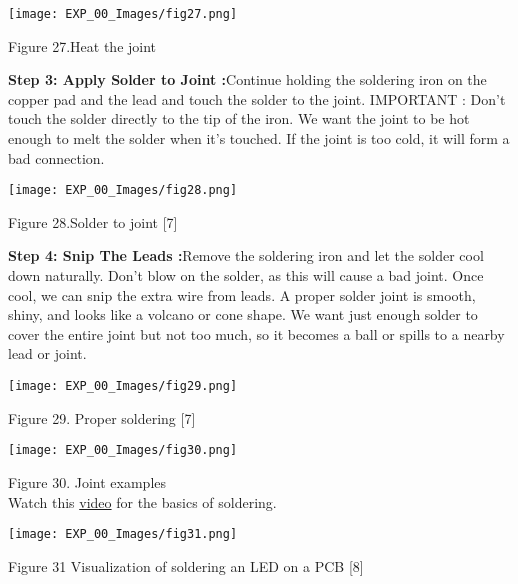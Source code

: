 \documentclass[12pt,a4paper]{article}
\begin{document}
\begin{justify}
\begin{center} 
\texttt{[image: EXP\_00\_Images/fig27.png]}
\end{center}
\vspace{-8mm}
\begin{center} {Figure 27.Heat the joint}\end{center}


\noindent \textbf{Step 3: Apply Solder to Joint :}Continue holding the soldering iron on the copper pad and the lead and touch the solder to the joint. IMPORTANT : Don't touch the solder directly to the tip of the iron. We want the joint to be hot enough to melt the solder when it's touched. If the joint is too cold, it will form a bad connection.

\begin{center} 
\texttt{[image: EXP\_00\_Images/fig28.png]}
\end{center}
\vspace{-8mm}
\begin{center} {Figure 28.Solder to joint [7]}\end{center}

\noindent \textbf{Step 4: Snip The Leads :}Remove the soldering iron and let the solder cool down naturally. Don't blow on the solder, as this will cause a bad joint. Once cool, we can snip the extra wire from leads. A proper solder joint is smooth, shiny, and looks like a volcano or cone shape. We want just enough solder to cover the entire joint but not too much, so it becomes a ball or spills to a nearby lead or joint.

\begin{center} 
\texttt{[image: EXP\_00\_Images/fig29.png]}
\end{center}
\vspace{-8mm}
\begin{center} {Figure 29. Proper soldering [7]}\end{center}

\begin{center} 
\texttt{[image: EXP\_00\_Images/fig30.png]}
\end{center}
\vspace{-8mm}
\begin{center} {Figure 30. Joint examples }\\
Watch this \href{https://www.youtube.com/watch?v=f95i88OSWB4&t=150s}{video} for the basics of soldering.
\end{center}

\begin{center} 
\texttt{[image: EXP\_00\_Images/fig31.png]}
\end{center}
\vspace{-8mm}
\begin{center} {Figure 31 Visualization of soldering an LED on a PCB [8] } \end{center}


\end{justify}
\end{document}
